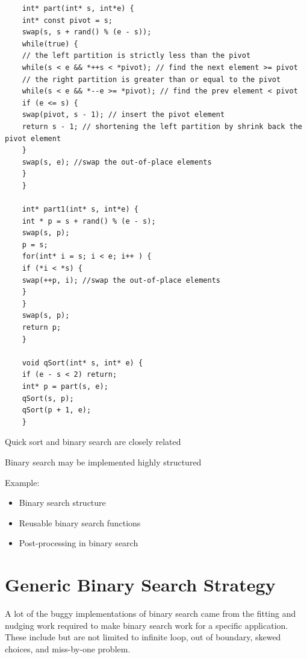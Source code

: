 \begin{verbatim}
    int* part(int* s, int*e) {
    int* const pivot = s;
    swap(s, s + rand() % (e - s));
    while(true) {
    // the left partition is strictly less than the pivot
    while(s < e && *++s < *pivot); // find the next element >= pivot
    // the right partition is greater than or equal to the pivot
    while(s < e && *--e >= *pivot); // find the prev element < pivot
    if (e <= s) {
    swap(pivot, s - 1); // insert the pivot element
    return s - 1; // shortening the left partition by shrink back the pivot element
    }
    swap(s, e); //swap the out-of-place elements
    }
    }

    int* part1(int* s, int*e) {
    int * p = s + rand() % (e - s);
    swap(s, p);
    p = s;
    for(int* i = s; i < e; i++ ) {
    if (*i < *s) {
    swap(++p, i); //swap the out-of-place elements
    }
    }
    swap(s, p);
    return p;
    }

    void qSort(int* s, int* e) {
    if (e - s < 2) return;
    int* p = part(s, e);
    qSort(s, p);
    qSort(p + 1, e);
    }
\end{verbatim}
Quick sort and binary search are closely related

Binary search may be implemented highly structured

Example: 

\begin{itemize}
    \item Binary search structure \label{Evernote:Closest Binary Search Tree Value II}
    \item Reusable binary search functions ~
    \item Post-processing in binary search \label{Evernote:Find median of two sorted arrays}
\end{itemize}

\section{Generic Binary Search Strategy}\label{generic-binary-search}

A lot of the buggy implementations of binary search came from the fitting and nudging work
required to make binary search work for a specific application.
These include but are not limited to infinite loop, out of boundary, skewed choices, and
miss-by-one problem.

